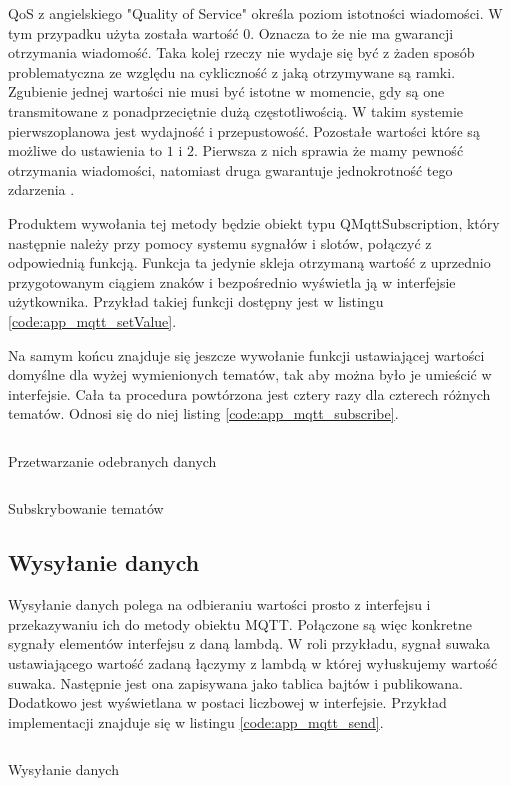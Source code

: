         QoS z angielskiego "Quality of Service" określa poziom istotności wiadomości. W tym przypadku użyta została wartość $0$. Oznacza to że nie ma gwarancji otrzymania wiadomość. Taka kolej rzeczy nie wydaje się być z żaden sposób problematyczna ze względu na cykliczność z jaką otrzymywane są ramki. Zgubienie jednej wartości nie musi być istotne w momencie, gdy są one transmitowane z ponadprzeciętnie dużą częstotliwością. W takim systemie pierwszoplanowa jest wydajność i przepustowość. Pozostałe wartości które są możliwe do ustawienia to $1$ i $2$. Pierwsza z nich sprawia że mamy pewność otrzymania wiadomości, natomiast druga gwarantuje jednokrotność tego zdarzenia \cite{QoS}. 
        
        Produktem wywołania tej metody będzie obiekt typu QMqttSubscription, który następnie należy przy pomocy systemu sygnałów i slotów, połączyć z odpowiednią funkcją. Funkcja ta jedynie skleja otrzymaną wartość z uprzednio przygotowanym ciągiem znaków i bezpośrednio wyświetla ją w interfejsie użytkownika. Przykład takiej funkcji dostępny jest w listingu \ref{code:app_mqtt_setValue}. 
        
        Na samym końcu znajduje się jeszcze wywołanie funkcji ustawiającej wartości domyślne dla wyżej wymienionych tematów, tak aby można było je umieścić w interfejsie. Cała ta procedura powtórzona jest cztery razy dla czterech różnych tematów. Odnosi się do niej listing \ref{code:app_mqtt_subscribe}. 
        
        
        \begin{kod}
          \inputminted[firstline=245, lastline=254]{cpp}{app/listings/mainwindow.cpp}
          \caption{Przetwarzanie odebranych danych}
          \label{code:app_mqtt_setValue}
        \end{kod}
        
      
        \begin{kod}
          \inputminted[firstline=186, lastline=205]{cpp}{app/listings/mainwindow.cpp}
          \caption{Subskrybowanie tematów}
          \label{code:app_mqtt_subscribe}
          \vspace{1em}
        \end{kod}
        
        
      \subsection{Wysyłanie danych}
        Wysyłanie danych polega na odbieraniu wartości prosto z interfejsu i przekazywaniu ich do metody obiektu MQTT. Połączone są więc konkretne sygnały elementów interfejsu z daną lambdą. W roli przykładu, sygnał suwaka ustawiającego wartość zadaną łączymy z lambdą w której wyłuskujemy wartość suwaka. Następnie jest ona zapisywana jako tablica bajtów i publikowana. Dodatkowo jest wyświetlana w postaci liczbowej w interfejsie. Przykład implementacji znajduje się w listingu \ref{code:app_mqtt_send}.
        
        \begin{kod}
          \inputminted[firstline=208, lastline=235]{cpp}{app/listings/mainwindow.cpp}
          \caption{Wysyłanie danych}
          \label{code:app_mqtt_send}
          \vspace{2em}
        \end{kod}       
        